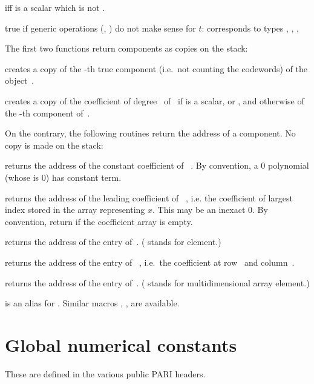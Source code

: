   iff  is a scalar which is not
.

 true if generic operations (,
) do not make sense for $t$: corresponds to types
, , , 

\label{se:accessors}
The first two functions return  components as copies on the stack:

 creates a copy of the -th true
component (i.e.\ not counting the codewords) of the object~.

 creates a copy of the coefficient of
degree~ of~ if  is a scalar,  or ,
and otherwise of the -th component of~.
\smallskip

\noindent On the contrary, the following routines return the address of a
 component. No copy is made on the stack:

 returns the address of the constant
coefficient of ~. By convention, a $0$ polynomial (whose
 is $0$) has  constant term.

 returns the address of the leading coefficient
of ~, i.e. the coefficient of largest index stored in the
array representing $x$. This may be an inexact $0$. By convention, return
 if the coefficient array is empty.

 returns the address of the
 entry of~. ( stands for element.)

 returns the address of the
 entry of ~, i.e.~the coefficient at row~
and column~.

 returns the address of the
 entry of~. ( stands for multidimensional array
element.)

 is an alias for .
Similar macros , ,  are available.

\section{Global numerical constants}
These are defined in the various public PARI headers.


